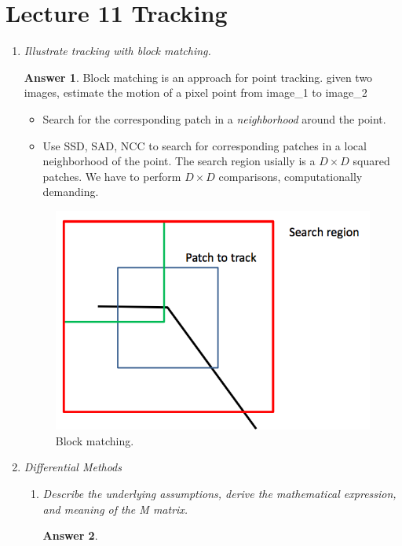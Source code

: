\documentclass[a4paper,12 pt]{article}
\theoremstyle{definition}
\theoremstyle{remark}
\theoremstyle{definition}
\theoremstyle{definition}
\theoremstyle{definition}
\theoremstyle{definition}
\theoremstyle{remark}
\theoremstyle{remark}
\theoremstyle{definition}
\theoremstyle{definition}
\newtheorem*{answer}{Answer}
\begin{document}
\section*{Lecture 11 Tracking}
\begin{enumerate}
\item \textit{Illustrate tracking with block matching.}
\begin{answer}
Block matching is an approach for point tracking. given two images, estimate the motion of a pixel point from image\_1 to image\_2
\begin{itemize}
\item Search for the corresponding patch in a \textit{neighborhood} around the point.
\item Use SSD, SAD, NCC to search for corresponding patches in a local neighborhood of the point. The search region usially is a $D\times D$ squared patches. We have to perform $D\times D$ comparisons, computationally demanding.
\end{itemize}
\begin{figure}[h!]
\begin{center}
\includegraphics[scale=0.35]{pics/block_matching}
\caption{Block matching. \label{fig:blockmatch}}
\end{center}
\end{figure}
\end{answer}
\item \textit{Differential Methods}
\begin{enumerate}
\item \textit{Describe the underlying assumptions, derive the
mathematical expression, and meaning of the M matrix.}
\begin{answer}

\end{answer}
\end{enumerate}
\end{enumerate}
\end{document}
